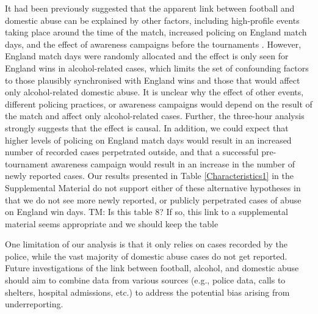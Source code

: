 \documentclass[12pt, a4paper]{article}
\newcommand{\TM}[1]{\textcolor{springgreen3}{TM: #1}}
\begin{document}
It had been previously suggested that the apparent link between football and domestic abuse can be explained by other factors, including high-profile events taking place around the time of the match, increased policing on England match days, and the effect of awareness campaigns before the tournaments \cite{Brooks-Hay2018}. 
However, England match days were randomly allocated and the effect is only seen for England wins in alcohol-related cases, which limits the set of confounding factors to those plausibly synchronised with England wins and those that would affect only alcohol-related domestic abuse. 
It is unclear why the effect of other events, different policing practices, or awareness campaigns would depend on the result of the match and affect only alcohol-related cases. 
Further, the three-hour analysis strongly suggests that the effect is causal.
In addition, we could expect that higher levels of policing on England match days would result in an increased number of recorded cases perpetrated outside, and that a successful pre-tournament awareness campaign would result in an increase in the number of newly reported cases. 
Our results presented in Table \ref{Characteristics1} in the Supplemental Material do not support either of these alternative hypotheses in that we do not see more newly reported, or publicly perpetrated cases of abuse on England win days. \TM{Is this table 8? If so, this link to a supplemental material seems appropriate and we should keep the table}

One limitation of our analysis is that it only relies on cases recorded by the police, while the vast majority of domestic abuse cases do not get reported. Future investigations of the link between football, alcohol, and domestic abuse should aim to combine data from various sources (e.g., police data, calls to shelters, hospital admissions, etc.) to address the potential bias arising from underreporting. 



\end{document}
